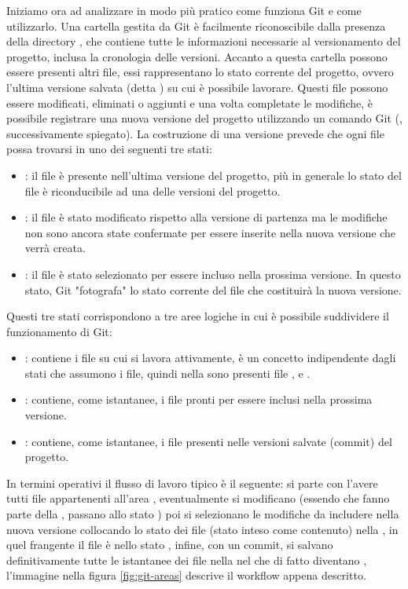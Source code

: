 Iniziamo ora ad analizzare in modo più pratico come funziona Git e come utilizzarlo. Una cartella gestita da Git è facilmente riconoscibile dalla presenza della directory , che contiene tutte le informazioni necessarie al versionamento del progetto, inclusa la cronologia delle versioni. 
Accanto a questa cartella possono essere presenti altri file, essi rappresentano lo stato corrente del progetto, ovvero l'ultima versione salvata (detta ) su cui è possibile lavorare. Questi file possono essere modificati, eliminati o aggiunti e una volta completate le modifiche, è possibile registrare una nuova versione del progetto utilizzando un comando Git (, successivamente spiegato). La costruzione di una versione prevede che ogni file possa trovarsi in uno dei seguenti tre stati:
\begin{itemize}
	\item {}: il file è presente nell'ultima versione del progetto, più in generale lo stato del file è riconducibile ad una delle versioni del progetto.
	\item {}: il file è stato modificato rispetto alla versione di partenza ma le modifiche non sono ancora state confermate per essere inserite nella nuova versione che verrà creata.
	\item {}: il file è stato selezionato per essere incluso nella prossima versione. In questo stato, Git "fotografa" lo stato corrente del file che costituirà la nuova versione.
\end{itemize}
Questi tre stati corrispondono a tre aree logiche in cui è possibile suddividere il funzionamento di Git:
\begin{itemize}
	\item {}: contiene i file su cui si lavora attivamente, è un concetto indipendente dagli stati che assumono i file, quindi nella  sono presenti file ,  e .
	\item {}: contiene, come istantanee, i file pronti per essere inclusi nella prossima versione. 
	\item {}: contiene, come istantanee, i file presenti nelle versioni salvate (commit) del progetto.
\end{itemize}
In termini operativi il flusso di lavoro tipico è il seguente: si parte con l'avere tutti file  appartenenti all'area , eventualmente si modificano (essendo che fanno parte della , passano allo stato ) poi si selezionano le modifiche da includere nella nuova versione collocando lo stato dei file (stato inteso come contenuto) nella , in quel frangente il file è nello stato , infine, con un commit, si salvano definitivamente tutte le istantanee dei file nella  nel  che di fatto diventano , l'immagine nella figura \ref{fig:git-areas} descrive il workflow appena descritto.

